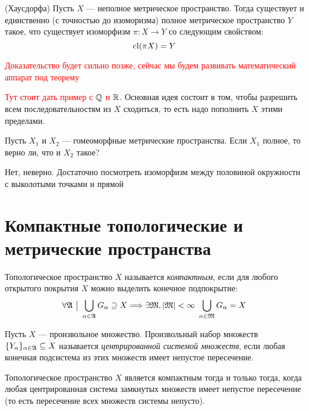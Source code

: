 \begin{theorem} (Хаусдорфа)
	Пусть $X$ --- неполное метрическое пространство. Тогда существует и единственно (с точностью до изоморизма) полное метрическое пространство $Y$ такое, что существует изоморфизм $\pi \colon X \to Y$ со следующим свойством:
	\[
		\operatorname{cl}(\pi X) = Y
	\]
\end{theorem}

\textcolor{red}{Доказательство будет сильно позже, сейчас мы будем развивать математический аппарат под теорему}

\begin{note}
	\textcolor{red}{Тут стоит дать пример с $\mathbb{Q}$ и $\mathbb{R}$}. Основная идея состоит в том, чтобы разрешить всем последовательностям из $X$ сходиться, то есть надо пополнить $X$ этими пределами.
\end{note}

\begin{exercise}
	Пусть $X_1$ и $X_2$ --- гомеоморфные метрические пространства. Если $X_1$ полное, то верно ли, что и $X_2$ такое?
\end{exercise}

\begin{solution}
	Нет, неверно. Достаточно посмотреть изоморфизм между половиной окружности с выколотыми точками и прямой
\end{solution}

\section{Компактные топологические и метрические пространства}

\begin{definition}
	Топологическое пространство $X$ называется \textit{компактным}, если для любого открытого покрытия $X$ можно выделить конечное подпокрытие:
	\[
		\forall \gA \such \bigcup_{\alpha \in \gA} G_\alpha \supseteq X \Lora \exists \gM, |\gM| < \infty\ \bigcup_{\alpha \in \gM} G_\alpha = X
	\]
\end{definition}

\begin{definition}
	Пусть $X$ --- произвольное множество. Произвольный набор множеств $\{Y_\alpha\}_{\alpha \in \mathfrak{A}} \subseteq X$ называется \textit{центрированной системой множеств}, если любая конечная подсистема из этих множеств имеет непустое пересечение.
\end{definition}

\begin{theorem}
	Топологическое пространство $X$ является компактным тогда и только тогда, когда любая центрированная система замкнутых множеств имеет непустое пересечение (то есть пересечение всех множеств системы непусто).
\end{theorem}

